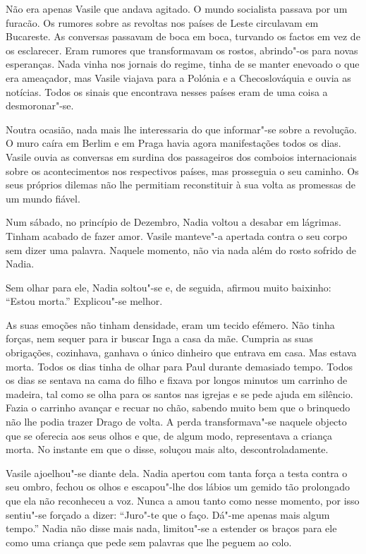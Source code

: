Não era apenas Vasile que andava agitado. O mundo socialista passava por
um furacão. Os rumores sobre as revoltas nos países de Leste circulavam
em Bucareste. As conversas passavam de boca em boca, turvando os factos
em vez de os esclarecer. Eram rumores que transformavam os rostos,
abrindo"-os para novas esperanças. Nada vinha nos jornais do regime,
tinha de se manter enevoado o que era ameaçador, mas Vasile viajava para
a Polónia e a Checoslováquia e ouvia as notícias. Todos os sinais que
encontrava nesses países eram de uma coisa a desmoronar"-se.

Noutra ocasião, nada mais lhe interessaria do que informar"-se sobre a
revolução. O muro caíra em Berlim e em Praga havia agora manifestações
todos os dias. Vasile ouvia as conversas em surdina dos passageiros dos
comboios internacionais sobre os acontecimentos nos respectivos
países, mas prosseguia o seu caminho. Os seus próprios dilemas não lhe
permitiam reconstituir à sua volta as promessas de um mundo fiável.

Num sábado, no princípio de Dezembro, Nadia voltou a desabar em
lágrimas. Tinham acabado de fazer amor. Vasile manteve"-a apertada contra
o seu corpo sem dizer uma palavra. Naquele momento, não via nada além do
rosto sofrido de Nadia.

Sem olhar para ele, Nadia soltou"-se e, de seguida, afirmou muito
baixinho: ``Estou morta.'' Explicou"-se melhor.

As suas emoções não tinham densidade, eram um tecido efémero. Não tinha
forças, nem sequer para ir buscar Inga a casa da mãe. Cumpria as suas
obrigações, cozinhava, ganhava o único dinheiro que entrava em casa. Mas
estava morta. Todos os dias tinha de olhar para Paul durante demasiado
tempo. Todos os dias se sentava na cama do filho e fixava por longos
minutos um carrinho de madeira, tal como se olha para os santos nas
igrejas e se pede ajuda em silêncio. Fazia o carrinho avançar e recuar
no chão, sabendo muito bem que o brinquedo não lhe podia trazer Drago de
volta. A perda transformava"-se naquele objecto que se oferecia aos seus
olhos e que, de algum modo, representava a criança morta. No instante em
que o disse, soluçou mais alto, descontroladamente.

Vasile ajoelhou"-se diante dela. Nadia apertou com tanta
força a testa contra o seu ombro, fechou os olhos e escapou"-lhe dos
lábios um gemido tão prolongado que ela não reconheceu a voz. Nunca a
amou tanto como nesse momento, por isso sentiu"-se forçado a dizer:
``Juro"-te que o faço. Dá"-me apenas mais algum tempo.'' Nadia não disse
mais nada, limitou"-se a estender os braços para ele como uma criança que
pede sem palavras que lhe peguem ao colo.



